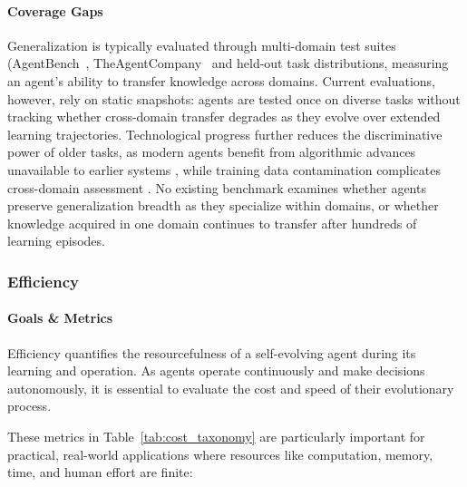 \documentclass[10pt]{article} %
\begin{document}
\paragraph{Coverage Gaps} Generalization is typically evaluated through multi-domain test suites (AgentBench~\citep{liu2023agentbench}, TheAgentCompany~\citep{xu2024theagentcompany} and held-out task distributions, measuring an agent’s ability to transfer knowledge across domains. Current evaluations, however, rely on static snapshots: agents are tested once on diverse tasks without tracking whether cross-domain transfer degrades as they evolve over extended learning trajectories. Technological progress further reduces the discriminative power of older tasks, as modern agents benefit from algorithmic advances unavailable to earlier systems \citep{chan2024mle}, while training data contamination complicates cross-domain assessment \citep{chan2024mle}. No existing benchmark examines whether agents preserve generalization breadth as they specialize within domains, or whether knowledge acquired in one domain continues to transfer after hundreds of learning episodes.


\subsubsection{Efficiency}


\paragraph{Goals \& Metrics} 
Efficiency quantifies the resourcefulness of a self-evolving agent during its learning and operation. As agents operate continuously and make decisions autonomously, it is essential to evaluate the cost and speed of their evolutionary process.

These metrics in Table~\ref{tab:cost_taxonomy} are particularly important for practical, real-world applications where resources like computation, memory, time, and human effort are finite:
\end{document}
